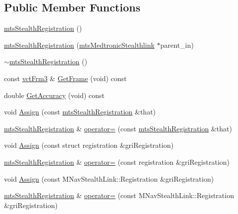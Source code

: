\subsection*{Public Member Functions}
\begin{DoxyCompactItemize}
\item 
\hyperlink{classmts_stealth_registration_a81080c46af0e98d66301faf0d50df7a9}{mts\-Stealth\-Registration} ()
\item 
\hyperlink{classmts_stealth_registration_a738984308970d3848c9dd5b0252fa778}{mts\-Stealth\-Registration} (\hyperlink{classmts_medtronic_stealthlink}{mts\-Medtronic\-Stealthlink} $\ast$parent\-\_\-in)
\item 
\hyperlink{classmts_stealth_registration_aa67f68f1a4b561db0048bfefc8390809}{$\sim$mts\-Stealth\-Registration} ()
\item 
const \hyperlink{vct_transformation_types_8h_a81feda0a02c2d1bc26e5553f409fed20}{vct\-Frm3} \& \hyperlink{classmts_stealth_registration_a1fe277744997a3d145d9c6afad0e5efa}{Get\-Frame} (void) const 
\item 
double \hyperlink{classmts_stealth_registration_ab0b636a72eb2f9875dde6e3bb1718588}{Get\-Accuracy} (void) const 
\item 
void \hyperlink{classmts_stealth_registration_af5edb0d59e648c60ebf86059a95c271b}{Assign} (const \hyperlink{classmts_stealth_registration}{mts\-Stealth\-Registration} \&that)
\item 
\hyperlink{classmts_stealth_registration}{mts\-Stealth\-Registration} \& \hyperlink{classmts_stealth_registration_a5b1b6941aa8d5dd181bc3f2228563033}{operator=} (const \hyperlink{classmts_stealth_registration}{mts\-Stealth\-Registration} \&that)
\item 
void \hyperlink{classmts_stealth_registration_af865efe13c402e2d1791bfa7cdcea0a8}{Assign} (const struct registration \&gri\-Registration)
\item 
\hyperlink{classmts_stealth_registration}{mts\-Stealth\-Registration} \& \hyperlink{classmts_stealth_registration_ad2750b56f0c2164e6537f2bc54215366}{operator=} (const registration \&gri\-Registration)
\item 
void \hyperlink{classmts_stealth_registration_a947218de69c47685ed23fd9d33f9211b}{Assign} (const M\-Nav\-Stealth\-Link\-::\-Registration \&gri\-Registration)
\item 
\hyperlink{classmts_stealth_registration}{mts\-Stealth\-Registration} \& \hyperlink{classmts_stealth_registration_a40b55f90ec7cffe938e238b9a35b1b03}{operator=} (const M\-Nav\-Stealth\-Link\-::\-Registration \&gri\-Registration)

\end{DoxyCompactItemize}
